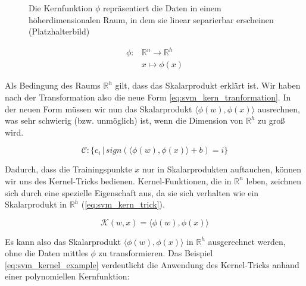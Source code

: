 \begin{figure}[htbp] \centering
    \caption{Die Kernfunktion $\phi$ repräsentiert die Daten in einem höherdimensionalen Raum, in dem sie linear separierbar erscheinen (Platzhalterbild)}
    \label{fig:svm_kernel}
\end{figure}

\begin{equation}
\label{eq:svm_kernel_function}
\begin{split}
    \phi : & \mathbb{R}^n \to \mathbb{R}^h \\
    & x \mapsto \phi(x)
\end{split} 
\end{equation}

Als Bedingung des Raums $\mathbb{R}^h$ gilt, dass das Skalarprodukt erklärt ist. 
Wir haben nach der Transformation also die neue Form \ref{eq:svm_kern_tranformation}. 
In der neuen Form müssen wir nun das Skalarprodukt $\langle\phi(w),\phi(x)\rangle$ ausrechnen, was sehr schwierig (bzw. unmöglich) ist, wenn die Dimension von $\mathbb{R}^h$ zu groß wird.

\begin{equation}
\label{eq:svm_kern_tranformation}
    \mathcal{C}: \{ c_i \,|\, sign(\langle \phi(w),\phi(x) \rangle + b) = i \}
\end{equation}

Dadurch, dass die Trainingspunkte $x$ nur in Skalarprodukten auftauchen, können wir uns des Kernel-Tricks bedienen.
Kernel-Funktionen, die in $\mathbb{R}^n$ leben, zeichnen sich durch eine spezielle Eigenschaft aus, da sie sich verhalten wie ein Skalarprodukt in $\mathbb{R}^h$ (\ref{eq:svm_kern_trick}). 

\begin{equation}
\label{eq:svm_kern_trick}
    \mathcal{K}(w,x) = \langle\phi(w),\phi(x)\rangle
\end{equation}

Es kann also das Skalarprodukt $\langle\phi(w),\phi(x)\rangle$ in $\mathbb{R}^h$ ausgerechnet werden, ohne die Daten mittles $\phi$ zu transformieren. 
Das Beispiel \ref{eq:svm_kernel_example} verdeutlicht die Anwendung des Kernel-Tricks  anhand einer polynomiellen Kernfunktion:

